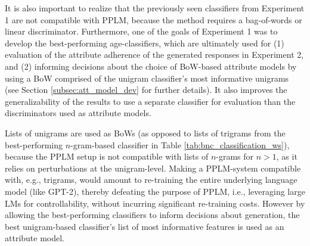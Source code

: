 It is also important to realize that the previously seen classifiers from Experiment 1 are not compatible with PPLM, because the method requires a bag-of-words or linear discriminator. Furthermore, one of the goals of Experiment 1 was to develop the best-performing age-classifiers, which are ultimately used for (1) evaluation of the attribute adherence of the generated responses in Experiment 2, and (2) informing decisions about the choice of BoW-based attribute models by using a BoW comprised of the unigram classifier's most informative unigrams (see Section \ref{subsec:att_model_dev} for further details). It also improves the generalizability of the results to use a separate classifier for evaluation than the discriminators used as attribute models.

Lists of unigrams are used as BoWs (as opposed to lists of trigrams from the best-performing $n$-gram-based classifier in Table \ref{tab:bnc_classification_ws}), because the PPLM setup is not compatible with lists of $n$-grams for $n > 1$, as it relies on perturbations at the unigram-level. Making a PPLM-system compatible with, e.g., trigrams, would amount to re-training the entire underlying language model (like GPT-2), thereby defeating the purpose of PPLM, i.e., leveraging large LMs for controllability, without incurring significant re-training costs. However by allowing the best-performing classifiers to inform decisions about generation, the best unigram-based classifier's list of most informative features is used as an attribute model.


